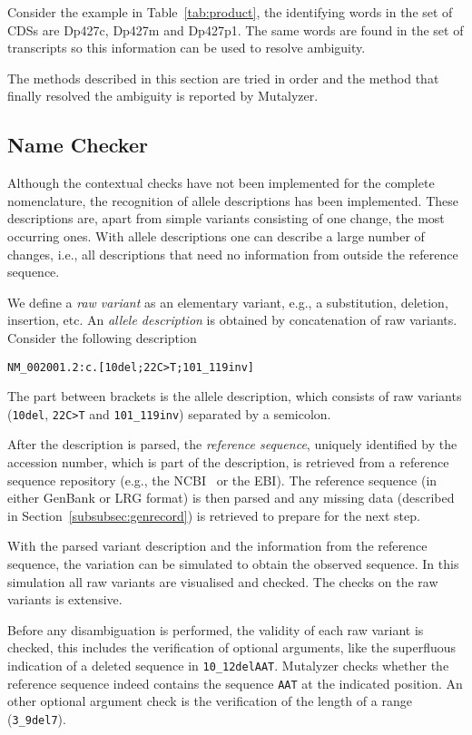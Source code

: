 \documentclass{article}
\begin{document}
Consider the example in Table~\ref{tab:product}, the identifying words in the
set of CDSs are Dp427c, Dp427m and Dp427p1. The same words are found in the set
of transcripts so this information can be used to resolve ambiguity.

The methods described in this section are tried in order and the method that
finally resolved the ambiguity is reported by Mutalyzer.

\subsection{Name Checker} \label{subsec:namecheck}
Although the contextual checks have not been implemented for the complete
nomenclature, the recognition of allele descriptions has been implemented.
These descriptions are, apart from simple variants consisting of one change,
the most occurring ones. With allele descriptions one can describe a large
number of changes, i.e., all descriptions that need no information from outside
the reference sequence.

We define a \emph{raw variant} as an elementary variant, e.g., a substitution,
deletion, insertion, etc. An \emph{allele description} is obtained by
concatenation of raw variants. Consider the following description
\begin{center}
  \texttt{NM\_002001.2:c.[10del;22C>T;101\_119inv]}
\end{center}
The part between brackets is
the allele description, which consists of raw variants (\texttt{10del},
\texttt{22C>T} and \texttt{101\_119inv}) separated by a semicolon.

After the description is parsed, the \emph{reference sequence}, uniquely
identified by the accession number, which is part of the description, is
retrieved from a reference sequence repository (e.g., the NCBI~\cite{NCBI} or
the EBI). The reference sequence (in either GenBank or LRG format) is then
parsed and any missing data (described in Section~\ref{subsubsec:genrecord}) is
retrieved to prepare for the next step.

With the parsed variant description and the information from the reference
sequence, the variation can be simulated to obtain the observed sequence. In
this simulation all raw variants are visualised and checked. The checks on the
raw variants is extensive.

Before any disambiguation is performed, the validity of each raw variant is
checked, this includes the verification of optional arguments, like the
superfluous indication of a deleted sequence in \texttt{10\_12delAAT}.
Mutalyzer checks whether the reference sequence indeed contains the sequence
\texttt{AAT} at the indicated position. An other optional argument check is the
verification of the length of a range (\texttt{3\_9del7}).
\end{document}
